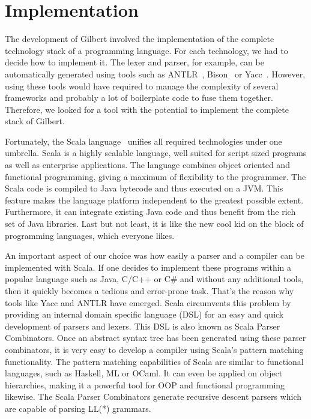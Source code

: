 \section{Implementation}
\label{cha:implementation}

The development of Gilbert involved the implementation of the complete technology stack of a programming language.
For each technology, we had to decide how to implement it.
The lexer and parser, for example, can be automatically generated using tools such as ANTLR~\cite{antlr}, Bison~\cite{bison} or Yacc~\cite{yacc}.
However, using these tools would have required to manage the complexity of several frameworks and probably a lot of boilerplate code to fuse them together.
Therefore, we looked for a tool with the potential to implement the complete stack of Gilbert.

Fortunately, the Scala language~\cite{scala,odersky:2010a} unifies all required technologies under one umbrella.
Scala is a highly scalable language, well suited for script sized programs as well as enterprise applications.
The language combines object oriented and functional programming, giving a maximum of flexibility to the programmer.
The Scala code is compiled to Java bytecode and thus executed on a JVM.
This feature makes the language platform independent to the greatest possible extent.
Furthermore, it can integrate existing Java code and thus benefit from the rich set of Java libraries.
Last but not least, it is like the new cool kid on the block of programming languages, which everyone likes.

An important aspect of our choice was how easily a parser and a compiler can be implemented with Scala.
If one decides to implement these programs within a popular language such as Java, C/C++ or C\# and without any additional tools, then it quickly becomes a tedious and error-prone task.
That's the reason why tools like Yacc and ANTLR have emerged.
Scala circumvents this problem by providing an internal domain specific language (DSL) for an easy and quick development of parsers and lexers.
This DSL is also known as Scala Parser Combinators.
Once an abstract syntax tree has been generated using these parser combinators, it is very easy to develop a compiler using Scala's pattern matching functionality.
The pattern matching capabilities of Scala are similar to functional languages, such as Haskell, ML or OCaml.
It can even be applied on object hierarchies, making it a powerful tool for OOP and functional programming likewise.
The Scala Parser Combinators generate recursive descent parsers which are capable of parsing LL(*) grammars.

